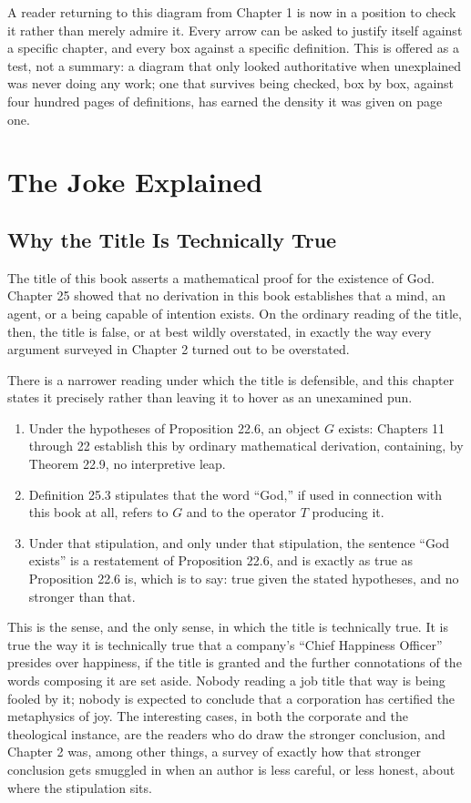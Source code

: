 \documentclass[11pt]{book}
\begin{document}
A reader returning to this diagram from Chapter 1 is now in a position to check it rather than merely admire it. Every arrow can be asked to justify itself against a specific chapter, and every box against a specific definition. This is offered as a test, not a summary: a diagram that only looked authoritative when unexplained was never doing any work; one that survives being checked, box by box, against four hundred pages of definitions, has earned the density it was given on page one.

\part{The Joke Explained}

\chapter{Why the Title Is Technically True}

The title of this book asserts a mathematical proof for the existence of God. Chapter 25 showed that no derivation in this book establishes that a mind, an agent, or a being capable of intention exists. On the ordinary reading of the title, then, the title is false, or at best wildly overstated, in exactly the way every argument surveyed in Chapter 2 turned out to be overstated.

There is a narrower reading under which the title is defensible, and this chapter states it precisely rather than leaving it to hover as an unexamined pun.

\begin{enumerate}
\item Under the hypotheses of Proposition 22.6, an object $G$ exists: Chapters 11 through 22 establish this by ordinary mathematical derivation, containing, by Theorem 22.9, no interpretive leap.
\item Definition 25.3 stipulates that the word ``God,'' if used in connection with this book at all, refers to $G$ and to the operator $T$ producing it.
\item Under that stipulation, and only under that stipulation, the sentence ``God exists'' is a restatement of Proposition 22.6, and is exactly as true as Proposition 22.6 is, which is to say: true given the stated hypotheses, and no stronger than that.
\end{enumerate}

This is the sense, and the only sense, in which the title is technically true. It is true the way it is technically true that a company's ``Chief Happiness Officer'' presides over happiness, if the title is granted and the further connotations of the words composing it are set aside. Nobody reading a job title that way is being fooled by it; nobody is expected to conclude that a corporation has certified the metaphysics of joy. The interesting cases, in both the corporate and the theological instance, are the readers who do draw the stronger conclusion, and Chapter 2 was, among other things, a survey of exactly how that stronger conclusion gets smuggled in when an author is less careful, or less honest, about where the stipulation sits.
\end{document}
